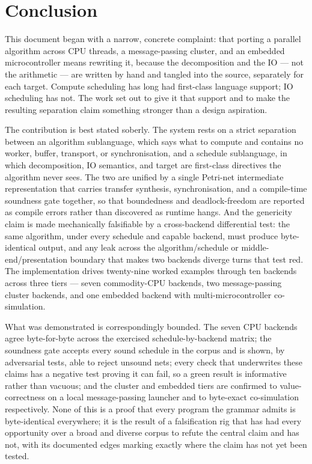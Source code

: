 \chapter{Conclusion}\label{ch:conclusion}

This document began with a narrow, concrete complaint: that porting a parallel
algorithm across CPU threads, a message-passing cluster, and an embedded
microcontroller means rewriting it, because the decomposition and the IO --- not the
arithmetic --- are written by hand and tangled into the source, separately for each
target. Compute scheduling has long had first-class language support; IO scheduling
has not. The work set out to give it that support and to make the resulting
separation claim something stronger than a design aspiration.

The contribution is best stated soberly. The system rests on a strict separation
between an algorithm sublanguage, which says what to compute and contains no worker,
buffer, transport, or synchronisation, and a schedule sublanguage, in which
decomposition, IO semantics, and target are first-class directives the algorithm
never sees. The two are unified by a single Petri-net intermediate representation
that carries transfer synthesis, synchronisation, and a compile-time soundness gate
together, so that boundedness and deadlock-freedom are reported as compile errors
rather than discovered as runtime hangs. And the genericity claim is made
mechanically falsifiable by a cross-backend differential test: the same algorithm,
under every schedule and capable backend, must produce byte-identical output, and
any leak across the algorithm/schedule or middle-end/presentation boundary that
makes two backends diverge turns that test red. The implementation drives
twenty-nine worked examples through ten
backends across three tiers --- seven commodity-CPU backends, two message-passing
cluster backends, and one embedded backend with multi-microcontroller co-simulation.

What was demonstrated is correspondingly bounded. The seven CPU backends agree
byte-for-byte across the exercised schedule-by-backend matrix; the soundness gate
accepts every sound schedule in the corpus and is shown, by adversarial tests, able
to reject unsound nets; every check that underwrites these claims has a negative
test proving it can fail, so a green result is informative rather than vacuous; and
the cluster and embedded tiers are confirmed to value-correctness on a local
message-passing launcher and to byte-exact co-simulation respectively. None of this
is a proof that every program the grammar admits is byte-identical everywhere; it is
the result of a falsification rig that has had every opportunity over a broad and
diverse corpus to refute the central claim and has not, with its documented edges
marking exactly where the claim has not yet been tested.

